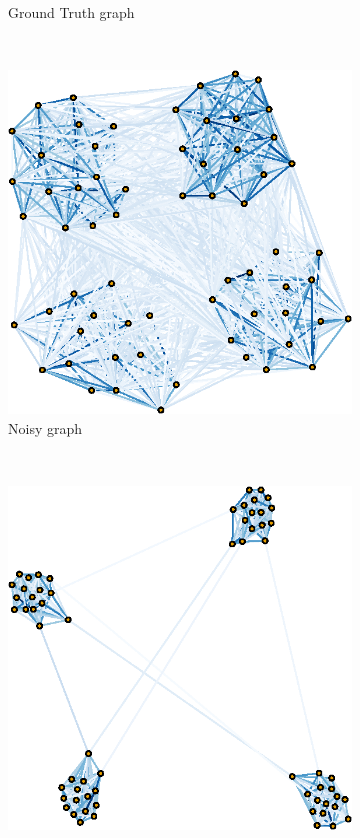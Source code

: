 \documentclass{article}
\begin{document}
\begin{figure}[!htb]
\begin{subfigure}[b]{0.3\textwidth}
        \caption{Ground Truth graph}
    \end{subfigure}
    ~ %
    \begin{subfigure}[b]{0.3\textwidth}
        \includegraphics[width=\textwidth]{noisy_graph.eps}
        \caption{Noisy graph}
    \end{subfigure}
    ~ %
    \begin{subfigure}[b]{0.3\textwidth}
        \includegraphics[width=\textwidth]{est_graph.eps}

\end{subfigure}
\end{figure}
\end{document}
